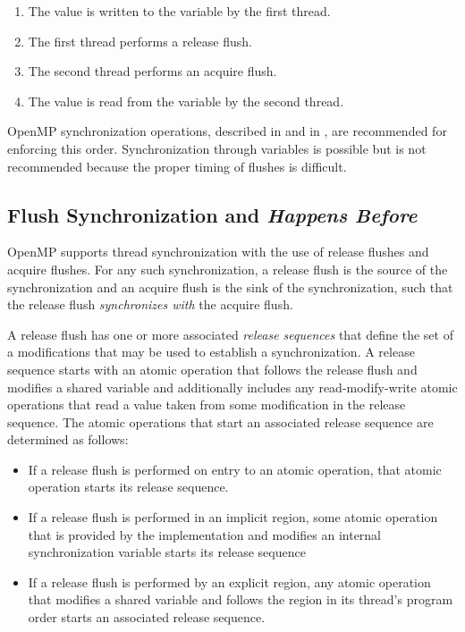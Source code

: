 \begin{enumerate}
    \item The value is written to the variable by the first thread.
    \item The first thread performs a release flush.
    \item The second thread performs an acquire flush.
    \item The value is read from the variable by the second thread.
\end{enumerate}

\begin{note}
OpenMP synchronization operations, described in 
 and in 
, are recommended for enforcing this 
order. Synchronization through variables is possible but is not 
recommended because the proper timing of flushes is difficult.
\end{note}


\subsection{Flush Synchronization and \emph{Happens Before}}
\label{subsec:happens-before}

OpenMP supports thread synchronization with the use of release flushes and
acquire flushes. For any such synchronization, a release flush is the source
of the synchronization and an acquire flush is the sink of the
synchronization, such that the release flush \emph{synchronizes with} the
acquire flush.

A release flush has one or more associated \emph{release sequences} that
define the set of a modifications that may be used to establish a
synchronization. A release sequence starts with an atomic operation
that follows the release flush and modifies a shared variable and additionally
includes any read-modify-write atomic operations that read a value taken from
some modification in the release sequence. The atomic operations that start an
associated release sequence are determined as follows:

\begin{itemize}
\item If a release flush is performed on entry to an atomic operation, that
    atomic operation starts its release sequence.
\item If a release flush is performed in an implicit  region, some atomic 
    operation that is provided by the implementation and modifies an internal
    synchronization variable starts its release sequence
\item If a release flush is performed by an explicit  region, any
    atomic operation that modifies a shared variable and follows the
     region in its thread's program order starts an associated
    release sequence.
\end{itemize}

